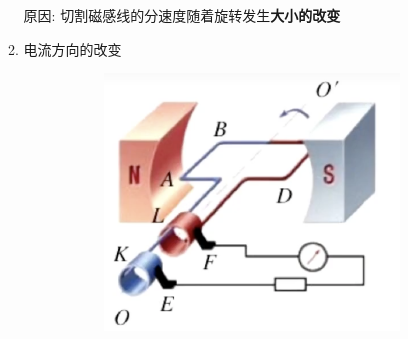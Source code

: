 \documentclass{article}
\begin{document}
\begin{enumerate}
\begin{enumerate}[label=(\arabic*)]
                    原因: \quad 切割磁感线的分速度随着旋转发生\textbf{大小的改变}

                    \vspace{5em}

              \item 电流方向的改变

                    \begin{figure}[h] %
                        \centering

                        \begin{subfigure}{0.4\textwidth}
                            \centering
                            \includegraphics[width=\textwidth,keepaspectratio]{pictures/1.1-3.png}
                            \caption{}
                        \end{subfigure}
                        \hfill %
                        \begin{subfigure}{0.4\textwidth}
                            \centering

\end{subfigure}
\end{figure}
\end{enumerate}
\end{enumerate}
\end{document}
